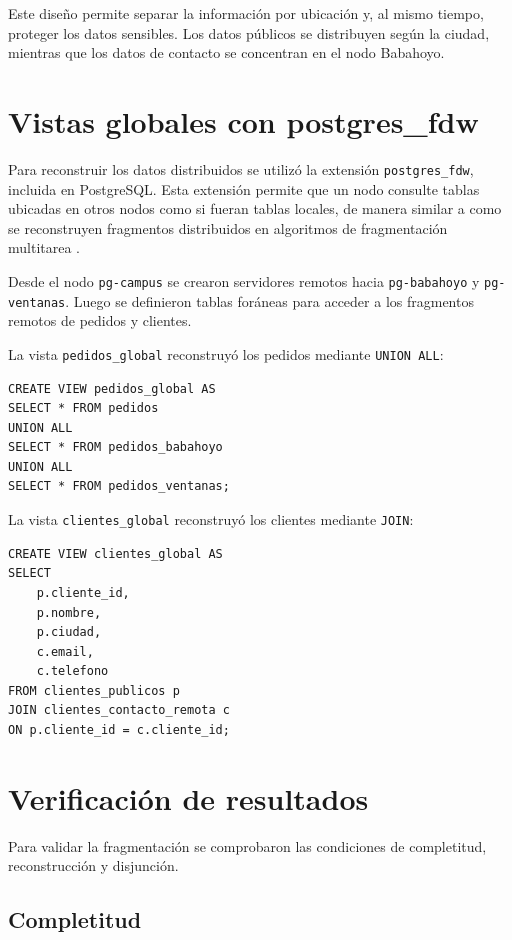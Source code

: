 \documentclass[12pt,a4paper]{article}
\begin{document}
Este diseño permite separar la información por ubicación y, al mismo tiempo, proteger los datos sensibles. Los datos públicos se distribuyen según la ciudad, mientras que los datos de contacto se concentran en el nodo Babahoyo.

\section{Vistas globales con postgres\_fdw}

Para reconstruir los datos distribuidos se utilizó la extensión \texttt{postgres\_fdw}, incluida en PostgreSQL. Esta extensión permite que un nodo consulte tablas ubicadas en otros nodos como si fueran tablas locales, de manera similar a como se reconstruyen fragmentos distribuidos en algoritmos de fragmentación multitarea \cite{ge2022vldb}.

Desde el nodo \texttt{pg-campus} se crearon servidores remotos hacia \texttt{pg-babahoyo} y \texttt{pg-ventanas}. Luego se definieron tablas foráneas para acceder a los fragmentos remotos de pedidos y clientes.

La vista \texttt{pedidos\_global} reconstruyó los pedidos mediante \texttt{UNION ALL}:

\begin{lstlisting}
CREATE VIEW pedidos_global AS
SELECT * FROM pedidos
UNION ALL
SELECT * FROM pedidos_babahoyo
UNION ALL
SELECT * FROM pedidos_ventanas;
\end{lstlisting}

La vista \texttt{clientes\_global} reconstruyó los clientes mediante \texttt{JOIN}:

\begin{lstlisting}
CREATE VIEW clientes_global AS
SELECT
    p.cliente_id,
    p.nombre,
    p.ciudad,
    c.email,
    c.telefono
FROM clientes_publicos p
JOIN clientes_contacto_remota c
ON p.cliente_id = c.cliente_id;
\end{lstlisting}

\section{Verificación de resultados}

Para validar la fragmentación se comprobaron las condiciones de completitud, reconstrucción y disjunción.

\subsection{Completitud}
\end{document}
